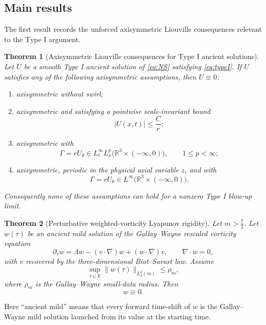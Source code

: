 \documentclass[11pt]{amsart}
\theoremstyle{plain}
\newtheorem{theorem}{Theorem}[section]
\theoremstyle{definition}
\theoremstyle{remark}
\numberwithin{equation}{section}
\begin{document}
\subsection{Main results}

The first result records the unforced axisymmetric Liouville consequences
relevant to the Type I argument.

\begin{theorem}[Axisymmetric Liouville consequences for Type I ancient solutions]
\label{thm:axisymmetric-liouville}
Let \(U\) be a smooth Type I ancient solution of \eqref{eq:NS} satisfying
\eqref{eq:typeI}.  If \(U\) satisfies any of the following axisymmetric
assumptions, then \(U\equiv0\):
\begin{enumerate}[label=\textup{(\roman*)}]
\item axisymmetric without swirl;
\item axisymmetric and satisfying a pointwise scale-invariant bound
\[
   |U(x,t)|\le \frac{C}{r};
\]
\item axisymmetric with
\[
   \Gamma=rU_\theta\in L_t^\infty L_x^p
   \bigl(\mathbb R^3\times(-\infty,0)\bigr),
   \qquad 1\le p<\infty;
\]
\item axisymmetric, periodic in the physical axial variable \(z\), and with
\[
   \Gamma=rU_\theta\in L^\infty
   \bigl(\mathbb R^3\times(-\infty,0)\bigr).
\]
\end{enumerate}
Consequently none of these assumptions can hold for a nonzero Type I blow-up
limit.
\end{theorem}

\begin{theorem}[Perturbative weighted-vorticity Lyapunov rigidity]
\label{thm:weighted-vorticity-vanishing-intro}
Let \(m>\frac72\).  Let \(w(\tau)\) be an ancient mild solution of the
Gallay--Wayne rescaled vorticity equation
\begin{equation}\label{eq:weighted-vorticity-intro}
   \partial_\tau w
   =
   \Lambda w-(v\cdot\nabla)w+(w\cdot\nabla)v,
   \qquad \nabla\cdot w=0,
\end{equation}
with \(v\) recovered by the three-dimensional Biot--Savart law.  Assume
\[
   \sup_{\tau\in\mathbb R}\|w(\tau)\|_{L^2_\sigma(m)}
   \le \rho_m,
\]
where \(\rho_m\) is the Gallay--Wayne small-data radius.  Then
\[
   w\equiv0.
\]
\end{theorem}

Here ``ancient mild'' means that every forward time-shift of \(w\) is the
Gallay--Wayne mild solution launched from its value at the starting time.
\end{document}
